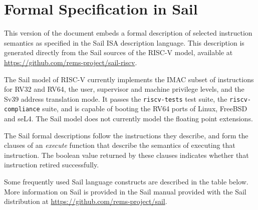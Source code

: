 \section{Formal Specification in Sail}
\label{sect:user-sail-model}

This version of the document embeds a formal description of selected
instruction semantics as specified in the Sail ISA description
language\cite{sail-site}.  This description is generated directly from
the Sail sources of the RISC-V model, available at
\url{https://github.com/rems-project/sail-riscv}.

The Sail model of RISC-V currently implements the IMAC subset of
instructions for RV32 and RV64, the user, supervisor and machine
privilege levels, and the Sv39 address translation mode.  It passes
the \texttt{riscv-tests} test suite, the \texttt{riscv-compliance}
suite, and is capable of booting the RV64 ports of Linux, FreeBSD and
seL4.  The Sail model does not currently model the floating point
extensions.

The Sail formal descriptions follow the instructions they describe, and
form the clauses of an \textit{execute} function that describe the
semantics of executing that instruction.  The boolean value returned
by these clauses indicates whether that instruction retired
successfully.

Some frequently used Sail language constructs are described in the
table below.  More information on Sail is provided in the Sail manual
provided with the Sail distribution at
\url{https://github.com/rems-project/sail}.

